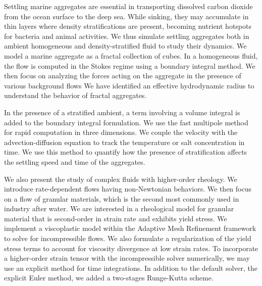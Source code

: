 
\par
Settling marine aggregates are essential in transporting dissolved carbon dioxide from the ocean surface to the deep sea. While sinking, they may accumulate in thin layers where density stratifications are present, becoming nutrient hotspots for bacteria and animal activities. We thus simulate settling aggregates both in ambient homogeneous and density-stratified fluid to study their dynamics. 
We model a marine aggregate as a fractal collection of cubes. 
In a homogeneous fluid, 
the flow is computed in the Stokes regime using a boundary integral method.
We then focus on analyzing the forces acting on the aggregate in the presence of various background flows
We have identified an effective hydrodynamic radius to understand the behavior of fractal aggregates.
\par
In the presence of a stratified ambient, a term involving a volume integral is added to the boundary integral formulation. We use the fast multipole method 
for rapid computation in three dimensions. We couple the velocity with the advection-diffusion equation to track the temperature or salt concentration in time. We use this method to quantify how the presence of stratification affects the settling speed and time of the aggregates.

\par
We also present the study of complex fluids with higher-order rheology. We introduce rate-dependent flows having non-Newtonian behaviors. 
We then focus on a flow of granular materials, which is the second most commonly used in industry after water.
We are interested in a rheological model for granular material that is second-order in strain rate and exhibits yield stress.
We implement a viscoplastic model within the Adaptive Mesh Refinement framework to solve for incompressible flows.
We also formulate a regularization of the yield stress terms to account for viscosity divergence at low strain rates. 
To incorporate a higher-order strain tensor with the incompressible solver numerically, we may use an explicit method for time integrations. In addition to the default solver, the explicit Euler method, we added a two-stages Runge-Kutta scheme.